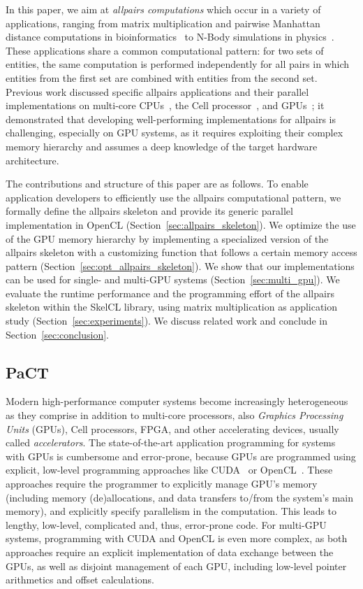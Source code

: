 In this paper, we aim at \emph{allpairs computations} which occur in a variety of applications, ranging from matrix multiplication and pairwise Manhattan distance computations in bioinformatics~\cite{ChangDeQuRo2009} to N-Body simulations in physics~\cite{AroraShVu2009}.
These applications share a common computational pattern:
for two sets of entities, the same computation is performed independently for all pairs in which entities from the first set are combined with entities from the second set.
Previous work discussed specific allpairs applications and their parallel implementations on multi-core CPUs~\cite{AroraShVu2009}, the Cell processor~\cite{WirawanSK09}, and GPUs~\cite{ChangDeQuRo2009,SarjeAl2013};
it demonstrated that developing well-performing implementations for allpairs is challenging, especially on GPU systems, as it requires exploiting their complex memory hierarchy and assumes a deep knowledge of the target hardware architecture.

The contributions and structure of this paper are as follows.
To enable application developers to efficiently use the allpairs computational pattern, we formally define the allpairs skeleton and provide its generic parallel implementation in OpenCL (Section~\ref{sec:allpairs_skeleton}).
We optimize the use of the GPU memory hierarchy by implementing a specialized version of the allpairs skeleton with a customizing function that follows a certain memory access pattern (Section~\ref{sec:opt_allpairs_skeleton}).
We show that our implementations can be used for single- and multi-GPU systems (Section~\ref{sec:multi_gpu}).
We evaluate the runtime performance and the programming effort of the allpairs skeleton within the SkelCL library, using matrix multiplication as application study (Section~\ref{sec:experiments}).
We discuss related work and conclude in Section~\ref{sec:conclusion}.

\subsection{PaCT}
Modern high-performance computer systems become increasingly heterogeneous as they comprise in addition to multi-core processors, also \emph{Graphics Processing Units} (GPUs), Cell processors, FPGA, and other accelerating devices, usually called \emph{accelerators}.
The state-of-the-art application programming for systems with GPUs is cumbersome and error-prone, because GPUs are programmed using explicit, low-level programming approaches like CUDA~\cite{CUDAProgrammingGuide} or OpenCL~\cite{OpenCL}.
These approaches require the programmer to explicitly manage GPU's memory (including memory (de)allocations, and data transfers to/from the system's main memory), and explicitly specify parallelism in the computation.
This leads to lengthy, low-level, complicated and, thus, error-prone code.
For multi-GPU systems, programming with CUDA and OpenCL is even more complex, as both approaches require an explicit implementation of data exchange between the GPUs, as well as disjoint management of each GPU, including low-level pointer arithmetics and offset calculations.

